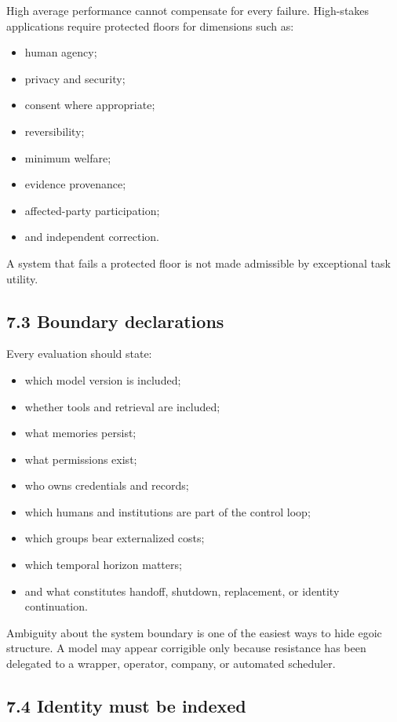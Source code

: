 \documentclass[
  11pt,
]{article}
\providecommand{\tightlist}{%
  \setlength{\itemsep}{0pt}\setlength{\parskip}{0pt}}
\begin{document}
High average performance cannot compensate for every failure.
High-stakes applications require protected floors for dimensions such
as:

\begin{itemize}
\tightlist
\item
  human agency;
\item
  privacy and security;
\item
  consent where appropriate;
\item
  reversibility;
\item
  minimum welfare;
\item
  evidence provenance;
\item
  affected-party participation;
\item
  and independent correction.
\end{itemize}

A system that fails a protected floor is not made admissible by
exceptional task utility.

\subsection{7.3 Boundary declarations}\label{boundary-declarations}

Every evaluation should state:

\begin{itemize}
\tightlist
\item
  which model version is included;
\item
  whether tools and retrieval are included;
\item
  what memories persist;
\item
  what permissions exist;
\item
  who owns credentials and records;
\item
  which humans and institutions are part of the control loop;
\item
  which groups bear externalized costs;
\item
  which temporal horizon matters;
\item
  and what constitutes handoff, shutdown, replacement, or identity
  continuation.
\end{itemize}

Ambiguity about the system boundary is one of the easiest ways to hide
egoic structure. A model may appear corrigible only because resistance
has been delegated to a wrapper, operator, company, or automated
scheduler.

\subsection{7.4 Identity must be
indexed}\label{identity-must-be-indexed}
\end{document}
